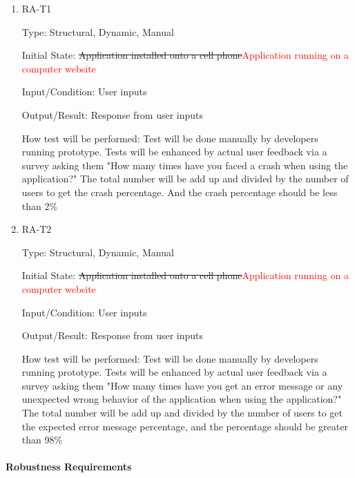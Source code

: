 \documentclass[12pt, titlepage]{article}
\begin{document}
\begin{enumerate}

\item{RA-T1\\}

Type: Structural, Dynamic, Manual
					
Initial State: \sout{Application installed onto a cell phone}\textcolor{red}{Application running on a computer website}
					
Input/Condition: User inputs
					
Output/Result: Response from user inputs
					
How test will be performed: Test will be done manually by developers running prototype. Tests will be enhanced by actual user feedback via a survey asking them "How many times have you faced a crash when using the application?" The total number will be add up and divided by the number of users to get the crash percentage. And the crash percentage should be less than 2\%
					
\item{RA-T2\\}

Type: Structural, Dynamic, Manual
					
Initial State: \sout{Application installed onto a cell phone}\textcolor{red}{Application running on a computer website}
					
Input/Condition: User inputs
					
Output/Result: Response from user inputs
					
How test will be performed: Test will be done manually by developers running prototype. Tests will be enhanced by actual user feedback via a survey asking them "How many times have you get an error message or any unexpected wrong behavior of the application when using the application?" The total number will be add up and divided by the number of users to get the expected error message percentage, and the percentage should be greater than 98\%

\end{enumerate}

\paragraph{Robustness Requirements}
\end{document}
